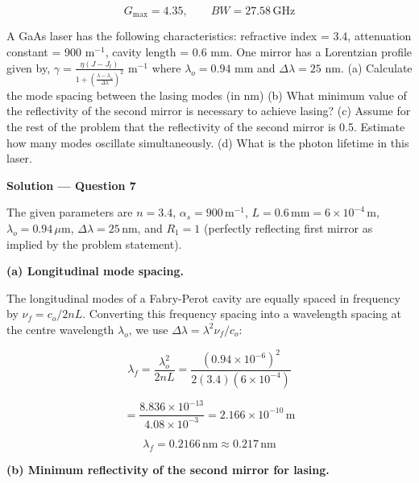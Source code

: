 \begin{equation*}
  \boxed{G_{\max} = 4.35, \qquad BW = 27.58\,\text{GHz}}
\end{equation*}

\begin{question}[Question 7]
A GaAs laser has the following characteristics: refractive index = 3.4, attenuation constant = 900 m$^{-1}$, cavity length = 0.6 mm. One mirror has a Lorentzian profile given by, $\gamma = \frac{\eta(J - J_t)}{1 + \left(\frac{\lambda - \lambda_o}{\Delta\lambda}\right)^2}$ m$^{-1}$ where $\lambda_o = 0.94$ mm and $\Delta\lambda = 25$ nm. (a) Calculate the mode spacing between the lasing modes (in nm) (b) What minimum value of the reflectivity of the second mirror is necessary to achieve lasing? (c) Assume for the rest of the problem that the reflectivity of the second mirror is 0.5. Estimate how many modes oscillate simultaneously. (d) What is the photon lifetime in this laser.
\end{question}

\textbf{\large Solution --- Question 7}

The given parameters are $n = 3.4$, $\alpha_s = 900\,\text{m}^{-1}$, $L = 0.6\,\text{mm} = 6\times10^{-4}\,\text{m}$, $\lambda_o = 0.94\,\mu\text{m}$, $\Delta\lambda = 25\,\text{nm}$, and $R_1 = 1$ (perfectly reflecting first mirror as implied by the problem statement).

\textbf{(a) Longitudinal mode spacing.}

The longitudinal modes of a Fabry-Perot cavity are equally spaced in frequency by $\nu_f = c_o / 2nL$. Converting this frequency spacing into a wavelength spacing at the centre wavelength $\lambda_o$, we use $\Delta\lambda = \lambda^2 \nu_f / c_o$:

\begin{equation*}
  \lambda_f = \frac{\lambda_o^2}{2nL} = \frac{(0.94\times10^{-6})^2}{2(3.4)(6\times10^{-4})}
\end{equation*}

\begin{equation*}
  = \frac{8.836\times10^{-13}}{4.08\times10^{-3}} = 2.166\times10^{-10}\,\text{m}
\end{equation*}

\begin{equation*}
  \boxed{\lambda_f = 0.2166\,\text{nm} \approx 0.217\,\text{nm}}
\end{equation*}

\textbf{(b) Minimum reflectivity of the second mirror for lasing.}

